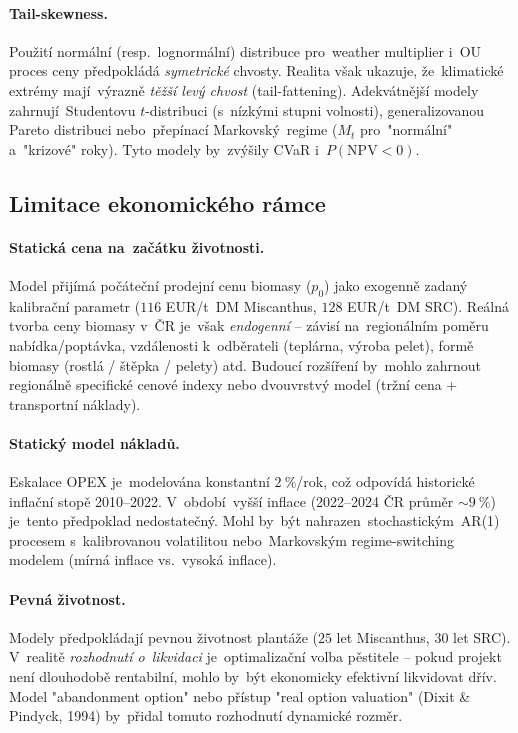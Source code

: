 \paragraph{Tail-skewness.}
Použití normální (resp.~lognormální) distribuce pro~weather multiplier
i~OU proces ceny předpokládá \emph{symetrické} chvosty. Realita však
ukazuje, že~klimatické extrémy mají~výrazně \emph{těžší levý chvost}
(tail-fattening). Adekvátnější modely zahrnují~Studentovu $t$-distribuci
(s~nízkými stupni volnosti), generalizovanou Pareto distribuci
nebo~přepínací Markovský~regime ($M_t$ pro~"normální" a~"krizové"
roky). Tyto modely by~zvýšily CVaR i~$P(\mathrm{NPV} < 0)$.

\subsection{Limitace ekonomického rámce}
\label{subsec:lim-ekon}

\paragraph{Statická cena na~začátku životnosti.}
Model přijímá počáteční prodejní cenu biomasy ($p_0$) jako exogenně
zadaný kalibrační parametr ($116$ EUR/t~DM Miscanthus, $128$ EUR/t~DM SRC).
Reálná tvorba ceny biomasy v~ČR je~však \emph{endogenní} -- závisí
na~regionálním poměru nabídka/poptávka, vzdálenosti k~odběrateli
(teplárna, výroba pelet), formě biomasy (rostlá / štěpka / pelety) atd.
Budoucí rozšíření by~mohlo zahrnout regionálně specifické cenové
indexy nebo dvouvrstvý model (tržní cena + transportní náklady).

\paragraph{Statický model nákladů.}
Eskalace OPEX je~modelována konstantní $2~\%$/rok, což odpovídá
historické inflační stopě 2010--2022. V~období~vyšší inflace
(2022--2024 ČR průměr $\sim 9~\%$) je~tento předpoklad nedostatečný.
Mohl by~být nahrazen~stochastickým~AR(1) procesem s~kalibrovanou
volatilitou nebo~Markovským regime-switching modelem (mírná inflace
vs.~vysoká inflace).

\paragraph{Pevná životnost.}
Modely předpokládají pevnou životnost plantáže ($25$ let Miscanthus,
$30$ let SRC). V~realitě \emph{rozhodnutí o~likvidaci} je~optimalizační
volba pěstitele -- pokud projekt není dlouhodobě rentabilní, mohlo
by~být ekonomicky efektivní likvidovat dřív. Model "abandonment option"
nebo přístup "real option valuation" (Dixit \& Pindyck, 1994) by~přidal
tomuto rozhodnutí dynamické rozměr.

